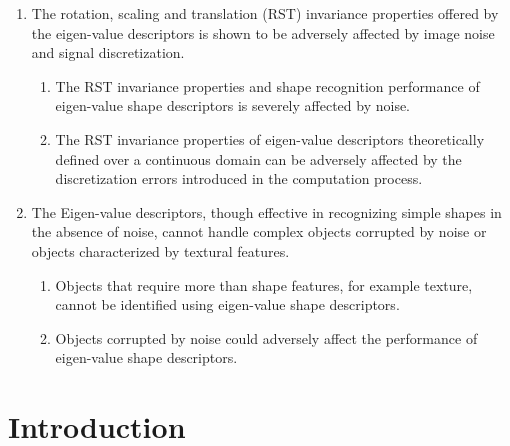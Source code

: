 \documentclass {udthesis}
\begin{document}
\begin{enumerate}[label=Section \arabic*:, start=0]
\begin{enumerate}[label=Para \arabic*:, start=1]
    \end{enumerate}

\item The rotation, scaling and translation (RST) invariance properties offered by the eigen-value descriptors is shown to be adversely affected by image noise and signal discretization.

    \begin{enumerate}[label=Para \arabic*:, start=1]

      \item The RST invariance properties and shape recognition performance of eigen-value shape descriptors is severely affected by noise.
      
      \item The RST invariance properties of eigen-value descriptors theoretically defined over a continuous domain can be adversely affected by the discretization errors introduced in the computation process. 
      
    \end{enumerate}

\item The Eigen-value descriptors, though effective in recognizing simple shapes in the absence of noise, cannot handle complex objects corrupted by noise or objects characterized by textural features.

    \begin{enumerate}[label=Para \arabic*:, start=1]

      \item Objects that require more than shape features, for example texture, cannot be identified using eigen-value shape descriptors.
      
      \item Objects corrupted by noise could adversely affect the performance of eigen-value shape descriptors.
      
    \end{enumerate}
    
\end{enumerate}


\section{Introduction}
\end{document}
